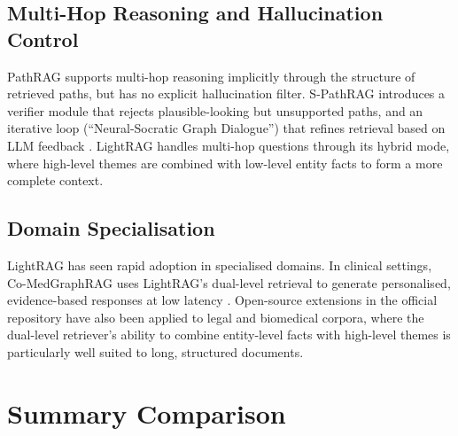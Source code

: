 \documentclass[12pt,a4paper,oneside]{report}
\begin{document}
\subsection{Multi-Hop Reasoning and Hallucination Control}
PathRAG supports multi-hop reasoning implicitly through the structure of
retrieved paths, but has no explicit hallucination filter. S-PathRAG
introduces a verifier module that rejects plausible-looking but unsupported
paths, and an iterative loop (``Neural-Socratic Graph Dialogue'') that
refines retrieval based on LLM feedback \citep{fu2026spathrag}. LightRAG
handles multi-hop questions through its hybrid mode, where high-level themes
are combined with low-level entity facts to form a more complete context.

\subsection{Domain Specialisation}
LightRAG has seen rapid adoption in specialised domains. In clinical
settings, Co-MedGraphRAG uses LightRAG's dual-level retrieval to generate
personalised, evidence-based responses at low latency
\citep{limedgraph2026}. Open-source extensions in the official repository
\citep{hkuds2025} have also been applied to legal and biomedical corpora,
where the dual-level retriever's ability to combine entity-level facts with
high-level themes is particularly well suited to long, structured documents.

\section{Summary Comparison}
\end{document}
